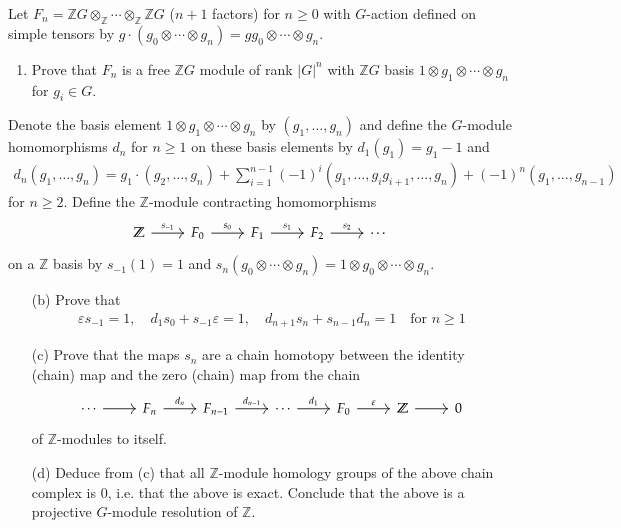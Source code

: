 \documentclass[12pt]{article}
\theoremstyle{definition}
\newenvironment{theorem}{\begin{mytheorem}}{\end{mytheorem}}
\theoremstyle{definitionstyle}
\def\mbb#1{\mathbb{#1}}
\def\ve{\varepsilon}
\newcommand{\Z}{\mbb Z}
\begin{document}
    \newpage
    \begin{theorem}
        Let $F_n = \Z G \otimes_{\Z} \cdots \otimes_{\Z} \Z G$ ($n+1$ factors) for $n \geq 0$ with $G$-action defined on simple tensors by $g \cdot (g_0 \otimes \cdots \otimes g_n) = gg_0 \otimes \cdots \otimes g_n$.
        \begin{enumerate}[label=(\alph*)]
            \item Prove that $F_n$ is a free $\Z G$ module of rank $|G|^n$ with $\Z G$ basis $1 \otimes g_1 \otimes \cdots \otimes g_n$ for $g_i \in G$.
        \end{enumerate}
        Denote the basis element $1 \otimes g_1 \otimes \cdots \otimes g_n$ by $(g_1, \ldots, g_n)$ and define the $G$-module homomorphisms $d_n$ for $n \geq 1$ on these basis elements by $d_1(g_1) = g_1-1$ and 
        \begin{align*}
            d_n(g_1, \ldots, g_n) = g_1 \cdot (g_2, \ldots, g_n) + \sum_{i=1}^{n-1} (-1)^i (g_1, \ldots, g_ig_{i+1}, \ldots, g_n) + (-1)^n (g_1, \ldots, g_{n-1})
        \end{align*}
        for $n \geq 2$. Define the $\Z$-module contracting homomorphisms
        \[\begin{tikzcd}
            \Z & {F_0} & {F_1} & {F_2} & \cdots
            \arrow["{s_{-1}}", from=1-1, to=1-2]
            \arrow["{s_0}", from=1-2, to=1-3]
            \arrow["{s_1}", from=1-3, to=1-4]
            \arrow["{s_2}", from=1-4, to=1-5]
        \end{tikzcd}\]
        on a $\Z$ basis by $s_{-1}(1) = 1$ and $s_n(g_0 \otimes \cdots \otimes g_n) = 1 \otimes g_0 \otimes \cdots \otimes g_n$.
        \begin{enumerate}
            \item[(b)] Prove that
            \begin{align*}
                \ve s_{-1} = 1, \quad d_1s_0 + s_{-1}\ve = 1, \quad d_{n+1}s_n + s_{n-1}d_n = 1 \quad \text{for } n \geq 1
            \end{align*}
            \item[(c)] Prove that the maps $s_n$ are a chain homotopy between the identity (chain) map and the zero (chain) map from the chain
            \[\begin{tikzcd}
                \cdots & {F_n} & {F_{n-1}} & \cdots & {F_0} & \Z & 0
                \arrow[from=1-1, to=1-2]
                \arrow["{d_n}", from=1-2, to=1-3]
                \arrow["{d_{n-1}}", from=1-3, to=1-4]
                \arrow["{d_1}", from=1-4, to=1-5]
                \arrow["\ve", from=1-5, to=1-6]
                \arrow[from=1-6, to=1-7]
            \end{tikzcd}\]
            of $\Z$-modules to itself.

            \item[(d)] Deduce from (c) that all $\Z$-module homology groups of the above chain complex is 0, i.e. that the above is exact. Conclude that the above is a projective $G$-module resolution of $\Z$.
        \end{enumerate}
    \end{theorem}
\end{document}
